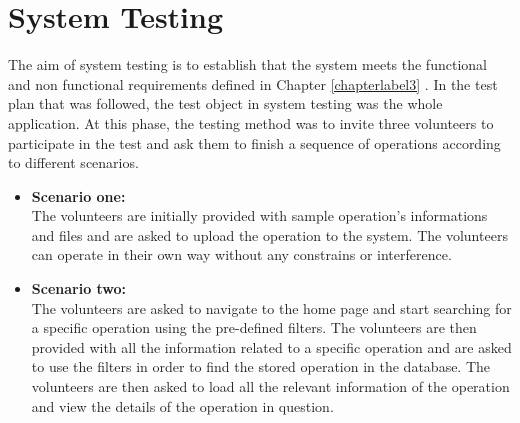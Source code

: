 \section{System Testing}
\label{system_testing}


The aim of system testing is to establish that the system meets the functional and non functional requirements defined in Chapter \ref{chapterlabel3} \cite{system_testing}. In the test plan that was followed, the test object in system testing was the whole application. At this phase, the testing method was to invite three volunteers to participate in the  test and ask them to finish a sequence of operations according to different scenarios. 




\begin{itemize}
  \item \textbf{Scenario one:}\\
  The volunteers are initially provided with sample operation's informations and files and are asked to upload the operation to the system. The volunteers can operate in their own way without any constrains or interference. 
    \item \textbf{Scenario two:}\\ 
The volunteers are asked to navigate to the home page and start searching for a specific operation using the pre-defined filters. The volunteers are then provided with all the information related to a specific operation and are asked to use the filters in order to find the stored operation in the database. The volunteers are then asked to load all the relevant information of the operation and view the details of the operation in question.
\end{itemize}


